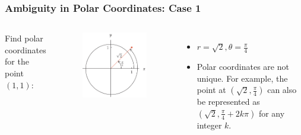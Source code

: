 \documentclass{beamer}
\begin{document}
\begin{frame}
\frametitle{Ambiguity in Polar Coordinates: Case 1}
\begin{columns}
    Find polar coordinates for the point \((1, 1)\):
        \begin{figure}
        \centering
        \includegraphics[width=\textwidth]{polar3.png}
        \end{figure}
    \begin{itemize}
        \item \(r = \sqrt{2}, \theta = \frac{\pi}{4}\)
        \item Polar coordinates are not unique. For example, the point at \( (\sqrt{2}, \frac{\pi}{4}) \) can also be represented as \( (\sqrt{2}, \frac{\pi}{4} + 2k\pi) \)  for any integer \( k \).
    \end{itemize}
\end{columns}
\end{frame}
\end{document}
